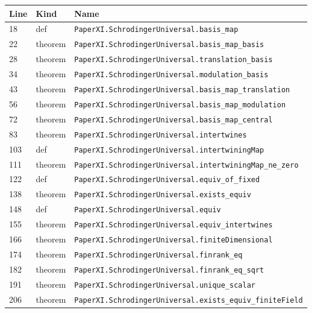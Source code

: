 \documentclass[10pt,oneside]{book}
\begin{document}
\begin{longtable}{@{}p{}p{}p{}@{}}\toprule Line&Kind&Name\\\midrule\endhead

18&def&\nolinkurl{PaperXI.SchrodingerUniversal.basis_map}\\

22&theorem&\nolinkurl{PaperXI.SchrodingerUniversal.basis_map_basis}\\

28&theorem&\nolinkurl{PaperXI.SchrodingerUniversal.translation_basis}\\

34&theorem&\nolinkurl{PaperXI.SchrodingerUniversal.modulation_basis}\\

43&theorem&\nolinkurl{PaperXI.SchrodingerUniversal.basis_map_translation}\\

56&theorem&\nolinkurl{PaperXI.SchrodingerUniversal.basis_map_modulation}\\

72&theorem&\nolinkurl{PaperXI.SchrodingerUniversal.basis_map_central}\\

83&theorem&\nolinkurl{PaperXI.SchrodingerUniversal.intertwines}\\

103&def&\nolinkurl{PaperXI.SchrodingerUniversal.intertwiningMap}\\

111&theorem&\nolinkurl{PaperXI.SchrodingerUniversal.intertwiningMap_ne_zero}\\

122&def&\nolinkurl{PaperXI.SchrodingerUniversal.equiv_of_fixed}\\

138&theorem&\nolinkurl{PaperXI.SchrodingerUniversal.exists_equiv}\\

148&def&\nolinkurl{PaperXI.SchrodingerUniversal.equiv}\\

155&theorem&\nolinkurl{PaperXI.SchrodingerUniversal.equiv_intertwines}\\

166&theorem&\nolinkurl{PaperXI.SchrodingerUniversal.finiteDimensional}\\

174&theorem&\nolinkurl{PaperXI.SchrodingerUniversal.finrank_eq}\\

182&theorem&\nolinkurl{PaperXI.SchrodingerUniversal.finrank_eq_sqrt}\\

191&theorem&\nolinkurl{PaperXI.SchrodingerUniversal.unique_scalar}\\

206&theorem&\nolinkurl{PaperXI.SchrodingerUniversal.exists_equiv_finiteField}\\

\bottomrule\end{longtable}
\end{document}
